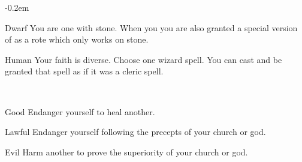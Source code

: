 \documentclass[8pt]{extarticle}
\begin{document}
\openup -0.2em

\charbanner

\begin{minipage}[t]{3.2in}

\begin{optfeature}{Dwarf}
  You are one with stone. When you  you are also granted
  a special version of  as a rote which
  only works on stone.
\end{optfeature}

\begin{optfeature}{Human}
  Your faith is diverse. Choose one wizard spell. You can cast and be
  granted that spell as if it was a cleric spell.
\end{optfeature}

\ 


\begin{optfeature}{Good}
  Endanger yourself to heal another.
\end{optfeature}

\begin{optfeature}{Lawful}
  Endanger yourself following the precepts of your church or god.
\end{optfeature}

\begin{optfeature}{Evil}
  Harm another to prove the superiority of your church or god.
\end{optfeature}


\ 



\vfill\null
\end{minipage}
\end{document}
